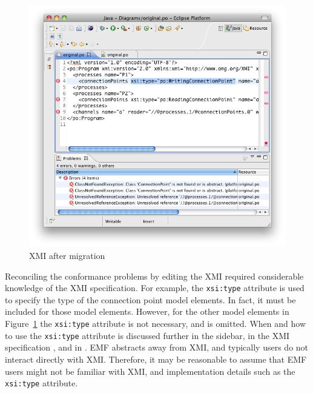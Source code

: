 \begin{figure}[htbp]
	\centering
	\includegraphics[width=13.5cm]{6.Evaluation/images/user_driven/po_migrated_xmi.png}
	\caption{XMI after migration}
	\label{fig:po_migrated_xmi}
\end{figure}

Reconciling the conformance problems by editing the XMI required considerable knowledge of the XMI specification. For example, the \texttt{xsi:type} attribute is used to specify the type of the connection point model elements. In fact, it must be included for those model elements. However, for the other model elements in Figure~\ref{fig:po_migrated_xmi} the \texttt{xsi:type} attribute is not necessary, and is omitted. When and how to use the \texttt{xsi:type} attribute is discussed further in the sidebar, in the XMI specification \cite{xmi}, and in \cite{steinberg09emf}. EMF abstracts away from XMI, and typically users do not interact directly with XMI. Therefore, it may be reasonable to assume that EMF users might not be familiar with XMI, and implementation details such as the \texttt{xsi:type} attribute.

